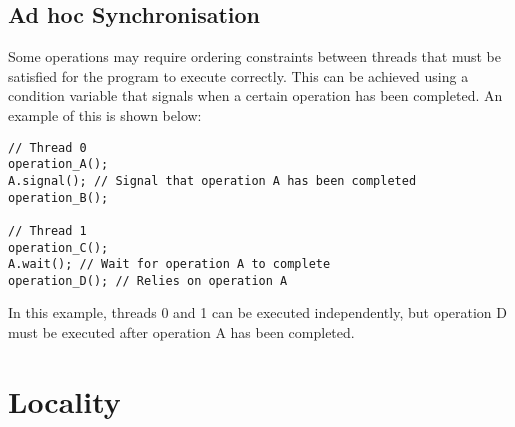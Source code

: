 \documentclass{article}
\begin{document}
\subsection{Ad hoc Synchronisation}
Some operations may require ordering constraints between threads that
must be satisfied for the program to execute correctly. This can be
achieved using a condition variable that signals when a certain
operation has been completed. An example of this is shown below:
\begin{verbatim}
// Thread 0
operation_A();
A.signal(); // Signal that operation A has been completed
operation_B();

// Thread 1
operation_C();
A.wait(); // Wait for operation A to complete
operation_D(); // Relies on operation A
\end{verbatim}
In this example, threads 0 and 1 can be executed independently, but
operation D must be executed after operation A has been completed.
\section{Locality}
\end{document}
